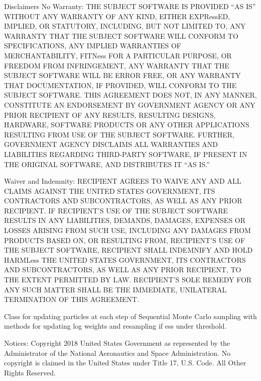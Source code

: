 \documentclass[letterpaper,10pt,english]{sphinxmanual}
\begin{document}
Disclaimers
No Warranty: THE SUBJECT SOFTWARE IS PROVIDED “AS IS” WITHOUT ANY WARRANTY OF
ANY KIND, EITHER EXPRessED, IMPLIED, OR STATUTORY, INCLUDING, BUT NOT LIMITED
TO, ANY WARRANTY THAT THE SUBJECT SOFTWARE WILL CONFORM TO SPECIFICATIONS, ANY
IMPLIED WARRANTIES OF MERCHANTABILITY, FITNess FOR A PARTICULAR PURPOSE, OR
FREEDOM FROM INFRINGEMENT, ANY WARRANTY THAT THE SUBJECT SOFTWARE WILL BE ERROR
FREE, OR ANY WARRANTY THAT DOCUMENTATION, IF PROVIDED, WILL CONFORM TO THE
SUBJECT SOFTWARE. THIS AGREEMENT DOES NOT, IN ANY MANNER, CONSTITUTE AN
ENDORSEMENT BY GOVERNMENT AGENCY OR ANY PRIOR RECIPIENT OF ANY RESULTS,
RESULTING DESIGNS, HARDWARE, SOFTWARE PRODUCTS OR ANY OTHER APPLICATIONS
RESULTING FROM USE OF THE SUBJECT SOFTWARE.  FURTHER, GOVERNMENT AGENCY
DISCLAIMS ALL WARRANTIES AND LIABILITIES REGARDING THIRD-PARTY SOFTWARE, IF
PRESENT IN THE ORIGINAL SOFTWARE, AND DISTRIBUTES IT “AS IS.”

Waiver and Indemnity:  RECIPIENT AGREES TO WAIVE ANY AND ALL CLAIMS AGAINST THE
UNITED STATES GOVERNMENT, ITS CONTRACTORS AND SUBCONTRACTORS, AS WELL AS ANY
PRIOR RECIPIENT.  IF RECIPIENT’S USE OF THE SUBJECT SOFTWARE RESULTS IN ANY
LIABILITIES, DEMANDS, DAMAGES, EXPENSES OR LOSSES ARISING FROM SUCH USE,
INCLUDING ANY DAMAGES FROM PRODUCTS BASED ON, OR RESULTING FROM, RECIPIENT’S
USE OF THE SUBJECT SOFTWARE, RECIPIENT SHALL INDEMNIFY AND HOLD HARMLess THE
UNITED STATES GOVERNMENT, ITS CONTRACTORS AND SUBCONTRACTORS, AS WELL AS ANY
PRIOR RECIPIENT, TO THE EXTENT PERMITTED BY LAW.  RECIPIENT’S SOLE REMEDY FOR
ANY SUCH MATTER SHALL BE THE IMMEDIATE, UNILATERAL TERMINATION OF THIS
AGREEMENT.

\begin{fulllineitems}
\label{\detokenize{source_code:smcpy.smc.particle_updater.ParticleUpdater}}
Class for updating particles at each step of Sequential Monte Carlo sampling
with methods for updating log weights and resampling if ess under threshold.

\end{fulllineitems}

\label{\detokenize{source_code:module-smcpy.smc.particle_mutator}}
Notices:
Copyright 2018 United States Government as represented by the Administrator of
the National Aeronautics and Space Administration. No copyright is claimed in
the United States under Title 17, U.S. Code. All Other Rights Reserved.
\end{document}
